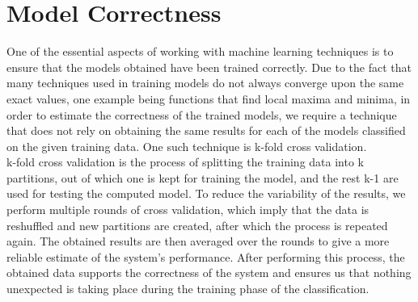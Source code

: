 \documentclass[11pt]{report}
\begin{document}
\section{Model Correctness}
One of the essential aspects of working with machine learning techniques is to ensure that the models obtained have been trained correctly. Due to the fact that many techniques used in training models do not always converge upon the same exact values, one example being functions that find local maxima and minima, in order to estimate the correctness of the trained models, we require a technique that does not rely on obtaining the same results for each of the models classified on the given training data. One such technique is k-fold cross validation. \\
k-fold cross validation is the process of splitting the training data into k partitions, out of which one is kept for training the model, and the rest k-1 are used for testing the computed model. To reduce the variability of the results, we perform multiple rounds of cross validation, which imply that the data is reshuffled and new partitions are created, after which the process is repeated again. The obtained results are then averaged over the rounds to give a more reliable estimate of the system's performance. After performing this process, the obtained data supports the correctness of the system and ensures us that nothing unexpected is taking place during the training phase of the classification. \\
\end{document}
